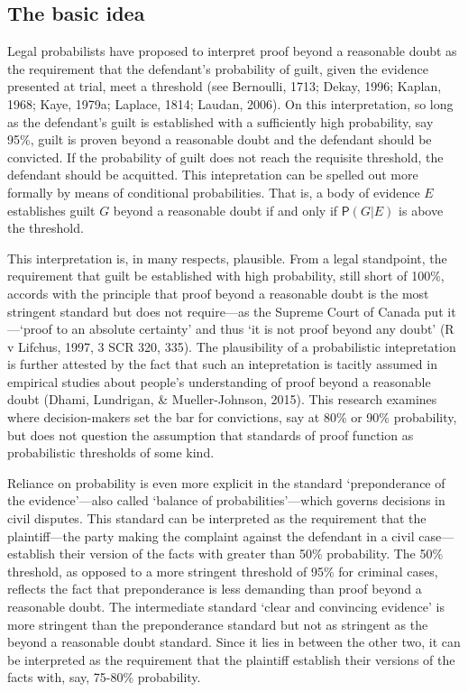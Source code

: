 \documentclass[10pt,dvipsnames,enabledeprecatedfontcommands]{scrartcl}
\newcommand{\pr}[1]{\mathsf{P}(#1)}
\begin{document}
\hypertarget{the-basic-idea}{%
\subsection{The basic idea}\label{the-basic-idea}}

Legal probabilists have proposed to interpret proof beyond a reasonable
doubt as the requirement that the defendant's probability of guilt,
given the evidence presented at trial, meet a threshold (see Bernoulli,
1713; Dekay, 1996; Kaplan, 1968; Kaye, 1979a; Laplace, 1814; Laudan,
2006). On this interpretation, so long as the defendant's guilt is
established with a sufficiently high probability, say 95\%, guilt is
proven beyond a reasonable doubt and the defendant should be convicted.
If the probability of guilt does not reach the requisite threshold, the
defendant should be acquitted. This intepretation can be spelled out
more formally by means of conditional probabilities. That is, a body of
evidence \(E\) establishes guilt \(G\) beyond a reasonable doubt if and
only if \(\pr{G\vert E}\) is above the threshold.

This interpretation is, in many respects, plausible. From a legal
standpoint, the requirement that guilt be established with high
probability, still short of 100\%, accords with the principle that proof
beyond a reasonable doubt is the most stringent standard but does not
require---as the Supreme Court of Canada put it---`proof to an absolute
certainty' and thus `it is not proof beyond any doubt' (R v Lifchus,
1997, 3 SCR 320, 335). The plausibility of a probabilistic intepretation
is further attested by the fact that such an intepretation is tacitly
assumed in empirical studies about people's understanding of proof
beyond a reasonable doubt (Dhami, Lundrigan, \& Mueller-Johnson, 2015).
This research examines where decision-makers set the bar for
convictions, say at 80\% or 90\% probability, but does not question the
assumption that standards of proof function as probabilistic thresholds
of some kind.

Reliance on probability is even more explicit in the standard
`preponderance of the evidence'---also called `balance of
probabilities'---which governs decisions in civil disputes. This
standard can be interpreted as the requirement that the plaintiff---the
party making the complaint against the defendant in a civil
case---establish their version of the facts with greater than 50\%
probability. The 50\% threshold, as opposed to a more stringent
threshold of 95\% for criminal cases, reflects the fact that
preponderance is less demanding than proof beyond a reasonable doubt.
The intermediate standard `clear and convincing evidence' is more
stringent than the preponderance standard but not as stringent as the
beyond a reasonable doubt standard. Since it lies in between the other
two, it can be interpreted as the requirement that the plaintiff
establish their versions of the facts with, say, 75-80\% probability.
\end{document}
